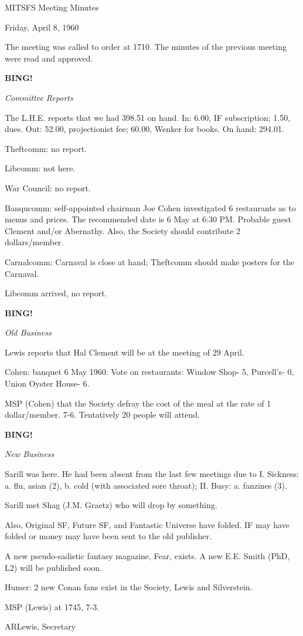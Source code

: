 \documentclass[12pt]{article}
\newcommand{\bing}{{\bf BING!} }
\newcommand{\goto}[1]{\bing \vskip 12pt \centerline{{\em{#1}}}}
\begin{document}
\begin{center}

MITSFS Meeting Minutes

Friday, April 8, 1960

\end{center}
 
\vspace{12pt}

\setlength{\parskip}{6pt}

\noindent
The meeting was called to order at 1710. The minutes of the previous meeting were read and approved.

\goto{Committee Reports}

The L.H.E. reports that we had 398.51 on hand. In: 6.00, IF subscription; 1.50, dues. Out: 52.00, projectionist fee; 60.00, Wenker for books. On hand: 294.01.

Theftcomm: no report.

Libcomm: not here.

War Council: no report.

Banqucomm: self-appointed chairman Joe Cohen investigated 6 restaurants as to menus and prices. The recommended date is 6 May at 6:30 PM. Probable guest Clement and/or Abernathy. Also, the Society should contribute 2 dollars/member.

Carnalcomm: Carnaval is close at hand; Theftcomm should make posters for the Carnaval.

Libcomm arrived, no report.

\goto{Old Business}

Lewis reports that Hal Clement will be at the meeting of 29 April.

Cohen: banquet 6 May 1960. Vote on restaurants: Window Shop- 5, Purcell's- 0, Union Oyster House- 6.

MSP (Cohen) that the Society defray the cost of the meal at the rate of 1 dollar/member. 7-6. Tentatively 20 people will attend.

\goto{New Business}

Sarill was here. He had been absent from the last few meetings due to I. Sickness: a. flu, asian (2), b. cold (with associated sore throat); II. Busy: a. fanzines (3).

Sarill met Shag (J.M. Graetz) who will drop by something.

Also, Original SF, Future SF, and Fantastic Universe have folded. IF may have folded or money may have been sent to the old publisher.

A new pseudo-sadistic fantasy magazine, Fear, exists. A new E.E. Smith (PhD, L2) will be published soon.

Humer: 2 new Conan fans exist in the Society, Lewis and Silverstein.

MSP (Lewis) at 1745, 7-3.

\vspace{12pt}

\centerline{ARLewis, Secretary}
\end{document}
